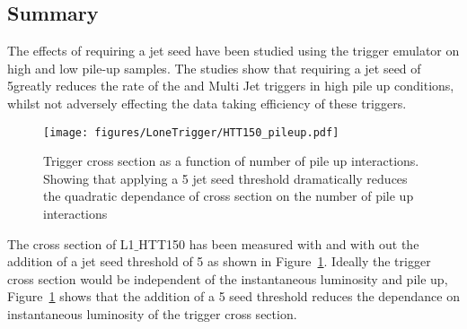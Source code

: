 
\subsection{Summary} %
\label{sec:Summary}
The effects of requiring a jet seed have been studied using the \Lone trigger 
emulator on high and low pile-up samples. The studies show that requiring a jet 
seed of 5\GeV greatly reduces the rate of the \HT and Multi Jet triggers in 
high pile up conditions, whilst not adversely effecting the data taking 
efficiency of these triggers.

\begin{figure}[ht]
  \centering
    \texttt{[image: figures/LoneTrigger/HTT150\_pileup.pdf]}
  \caption{Trigger cross section as a function of number of pile up 
  interactions. Showing that applying a 5 \GeV jet seed threshold dramatically 
  reduces the quadratic dependance of cross section on the number of pile up 
  interactions}
  \label{fig:figures_HTT150_pileup}
\end{figure}

The cross section of L1$\_$HTT150 has been measured with and with out the 
addition of a jet seed threshold of 5 \GeV as shown in  
Figure~\ref{fig:figures_HTT150_pileup}. Ideally the trigger cross section would 
be independent of the instantaneous luminosity and pile up, 
Figure~\ref{fig:figures_HTT150_pileup} shows that the addition of a 5 \GeV seed 
threshold reduces the dependance on instantaneous luminosity of the trigger 
cross section.


